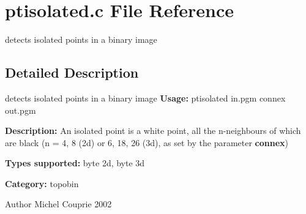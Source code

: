 \section{ptisolated.c File Reference}
\label{ptisolated_8c}


detects isolated points in a binary image  




\subsection{Detailed Description}
detects isolated points in a binary image {\bfseries Usage:} ptisolated in.pgm connex out.pgm

{\bfseries Description:} An isolated point is a white point, all the n-\/neighbours of which are black (n = 4, 8 (2d) or 6, 18, 26 (3d), as set by the parameter {\bfseries connex})

{\bfseries Types supported:} byte 2d, byte 3d

{\bfseries Category:} topobin

\begin{DoxyAuthor}{Author}
Michel Couprie 2002 
\end{DoxyAuthor}
